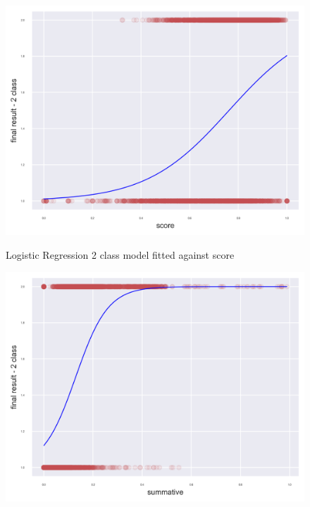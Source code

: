 \documentclass[11pt, a4paper, twocolumn]{article}
\begin{document}
\centering
\begin{figure}[h]
	\includegraphics[width=0.99\linewidth]{LogisticRegression_2_class_model_against_score.png} 
	\label{fig:LogScore}
	\caption{Logistic Regression 2 class model fitted against score}
\end{figure}
\centering
\begin{figure}[h]
	\includegraphics[width=0.99\linewidth]{LogisticRegression_2_class_model_against_summative.png} 
	\label{fig:LogSumm}
	\caption{}
\end{figure}
\centering
\end{document}
